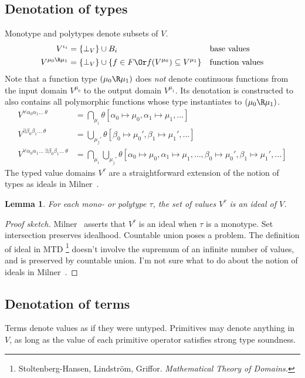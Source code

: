 \documentclass{amsart}
\newtheorem{lemma}[subsection]{Lemma}
\theoremstyle{definition}
\begin{document}
\subsection{Denotation of types}
Monotype and polytypes denote subsets of $V$.
\begin{align*}
V^{\iota_i} &= \{\bot_V\}\cup B_i &&\mbox{base values}
\\
V^{\mu_0 \R \mu_1} &=
  \{\bot_V\}\cup
  \{f\in F \Or f(V^{\mu_0}) \subseteq V^{\mu_1}\}
  &&\mbox{function values}
\end{align*}
Note that a function type $(\mu_0\R\mu_1)$ does \emph{not} denote
continuous functions from the input domain $V^{\mu_0}$ to the
output domain $V^{\mu_1}$. Its denotation is constructed to also
contains all polymorphic functions whose type instantiates to 
$(\mu_0\R\mu_1)$.
\begin{align*}
V^{\forall\alpha_0\alpha_1\ldots~\theta} &=
  \bigcap_{\mu_i}
  \theta[\alpha_0\mapsto\mu_0,\alpha_1\mapsto\mu_1,\ldots]
\\
V^{\exists\beta_0\beta_1\ldots~\theta} &=
  \bigcup_{\mu_j'}
  \theta[\beta_0\mapsto\mu_0',\beta_1\mapsto\mu_1',\ldots]
\\
V^{\forall\alpha_0\alpha_1\ldots~\exists\beta_0\beta_1\ldots~\theta}
&=\bigcap_{\mu_i}
  \bigcup_{\mu_j'} \theta[
  \alpha_0\mapsto\mu_0,\alpha_1\mapsto\mu_1,\ldots,
  \beta_0\mapsto\mu_0',\beta_1\mapsto\mu_1',\ldots]
\end{align*}
The typed value domains $V^\tau$ are a straightforward extension
of the notion of types as ideals in Milner~\cite{Milner78}.

\begin{lemma}
For each mono- or polytype $\tau$, the set of values $V^\tau$ is
an ideal of $V$.
\end{lemma}

\begin{proof}[Proof sketch]
Milner~\cite{Milner78} asserts that $V^\tau$ is an ideal when
$\tau$ is a monotype. Set intersection preserves idealhood.
Countable union poses a problem. The definition of ideal in MTD%
%
\footnote{Stoltenberg-Hansen, Lindstr\"om,
Griffor. \emph{Mathematical Theory of Domains.}}
%
doesn't involve the supremum of an infinite number of values, and
is preserved by countable union. I'm not sure what to do about
the notion of ideals in Milner~\cite{Milner78}.
\end{proof}

\subsection{Denotation of terms} Terms denote values as if they
were untyped. Primitives may denote anything in $V$, as long as
the value of each primitive operator satisfies strong type
soundness.
\end{document}
